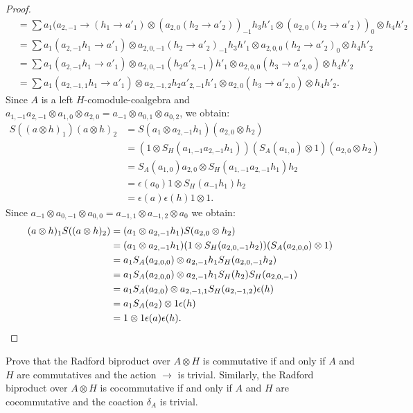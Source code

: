\documentclass[12pt]{amsproc}
\begin{document}
\begin{proof}
\begin{align*}
 & =\sum a_{1}(a_{2,-1}\to(h_{1}\to a'_{1})\otimes(a_{2,0}(h_{2}\to a'_{2}))_{-1}h_{3}h'_{1}\otimes(a_{2,0}(h_{2}\to a'_{2}))_{0}\otimes h_{4}h'_{2}\\
 & =\sum a_{1}(a_{2,-1}h_{1}\to a'_{1})\otimes a_{2,0,-1}(h_{2}\to a'_{2})_{-1}h_{3}h'_{1}\otimes a_{2,0,0}(h_{2}\to a'_{2})_{0}\otimes h_{4}h'_{2}\\
 & =\sum a_{1}(a_{2,-1}h_{1}\to a'_{1})\otimes a_{2,0,-1}(h_{2}a'_{2,-1})h'_{1}\otimes a_{2,0,0}(h_{3}\to a'_{2,0})\otimes h_{4}h'_{2}\\
 & =\sum a_{1}(a_{2,-1,1}h_{1}\to a'_{1})\otimes a_{2,-1,2}h_{2}a'_{2,-1}h'_{1}\otimes a_{2,0}(h_{3}\to a'_{2,0})\otimes h_{4}h'_{2}.
\end{align*}
Since $A$ is a left $H$-comodule-coalgebra and $a_{1,-1}a_{2,-1}\otimes a_{1,0}\otimes a_{2,0}=a_{-1}\otimes a_{0,1}\otimes a_{0,2}$,
we obtain: 
\begin{align*}
S((a\otimes h)_{1})(a\otimes h)_{2} & =S(a_{1}\otimes a_{2,-1}h_{1})(a_{2,0}\otimes h_{2})\\
 & =(1\otimes S_{H}(a_{1,-1}a_{2,-1}h_{1}))(S_{A}(a_{1,0})\otimes1)(a_{2,0}\otimes h_{2})\\
 & =S_{A}(a_{1,0})a_{2,0}\otimes S_{H}(a_{1,-1}a_{2,-1}h_{1})h_{2}\\
 & =\epsilon(a_{0})1\otimes S_{H}(a_{-1}h_{1})h_{2}\\
 & =\epsilon(a)\epsilon(h)1\otimes1.
\end{align*}
Since $a_{-1}\otimes a_{0,-1}\otimes a_{0,0}=a_{-1,1}\otimes a_{-1,2}\otimes a_{0}$ we obtain:
\begin{align*}
(a\otimes h)_{1}S((a\otimes h)_{2}) & =(a_{1}\otimes a_{2,-1}h_{1})S(a_{2,0}\otimes h_{2})\\
 & =(a_{1}\otimes a_{2,-1}h_{1})(1\otimes S_{H}(a_{2,0,-1}h_{2}))(S_{A}(a_{2,0,0})\otimes1)\\
 & =a_{1}S_{A}(a_{2,0,0})\otimes a_{2,-1}h_{1}S_{H}(a_{2,0,-1}h_{2})\\
 & =a_{1}S_{A}(a_{2,0,0})\otimes a_{2,-1}h_{1}S_{H}(h_{2})S_{H}(a_{2,0,-1})\\
 & =a_{1}S_{A}(a_{2,0})\otimes a_{2,-1,1}S_{H}(a_{2,-1,2})\epsilon(h)\\
 & =a_{1}S_{A}(a_{2})\otimes1\epsilon(h)\\
 & =1\otimes1\epsilon(a)\epsilon(h).\qedhere
 \end{align*}
\end{proof}

\begin{exercise}
Prove that the Radford biproduct over $A\otimes H$ is commutative if and only
if $A$ and $H$ are commutatives and the action $\to$ is trivial.  Similarly,
the Radford biproduct over $A\otimes H$ is cocommutative if and only if $A$ and
$H$ are cocommutative and the coaction $\delta_{A}$ is trivial.
\end{exercise}
\end{document}
